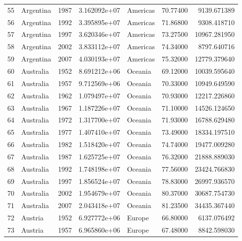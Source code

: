 \documentclass[
  letterpaper,
  DIV=11,
  numbers=noendperiod]{scrreprt}
\begin{document}
\begin{tabular}{llrrlrr}
55   &                 Argentina &  1987 &  3.162092e+07 &  Americas &  70.77400 &    9139.671389 \\
56   &                 Argentina &  1992 &  3.395895e+07 &  Americas &  71.86800 &    9308.418710 \\
57   &                 Argentina &  1997 &  3.620346e+07 &  Americas &  73.27500 &   10967.281950 \\
58   &                 Argentina &  2002 &  3.833112e+07 &  Americas &  74.34000 &    8797.640716 \\
59   &                 Argentina &  2007 &  4.030193e+07 &  Americas &  75.32000 &   12779.379640 \\
60   &                 Australia &  1952 &  8.691212e+06 &   Oceania &  69.12000 &   10039.595640 \\
61   &                 Australia &  1957 &  9.712569e+06 &   Oceania &  70.33000 &   10949.649590 \\
62   &                 Australia &  1962 &  1.079497e+07 &   Oceania &  70.93000 &   12217.226860 \\
63   &                 Australia &  1967 &  1.187226e+07 &   Oceania &  71.10000 &   14526.124650 \\
64   &                 Australia &  1972 &  1.317700e+07 &   Oceania &  71.93000 &   16788.629480 \\
65   &                 Australia &  1977 &  1.407410e+07 &   Oceania &  73.49000 &   18334.197510 \\
66   &                 Australia &  1982 &  1.518420e+07 &   Oceania &  74.74000 &   19477.009280 \\
67   &                 Australia &  1987 &  1.625725e+07 &   Oceania &  76.32000 &   21888.889030 \\
68   &                 Australia &  1992 &  1.748198e+07 &   Oceania &  77.56000 &   23424.766830 \\
69   &                 Australia &  1997 &  1.856524e+07 &   Oceania &  78.83000 &   26997.936570 \\
70   &                 Australia &  2002 &  1.954679e+07 &   Oceania &  80.37000 &   30687.754730 \\
71   &                 Australia &  2007 &  2.043418e+07 &   Oceania &  81.23500 &   34435.367440 \\
72   &                   Austria &  1952 &  6.927772e+06 &    Europe &  66.80000 &    6137.076492 \\
73   &                   Austria &  1957 &  6.965860e+06 &    Europe &  67.48000 &    8842.598030 \\

\end{tabular}
\end{document}
